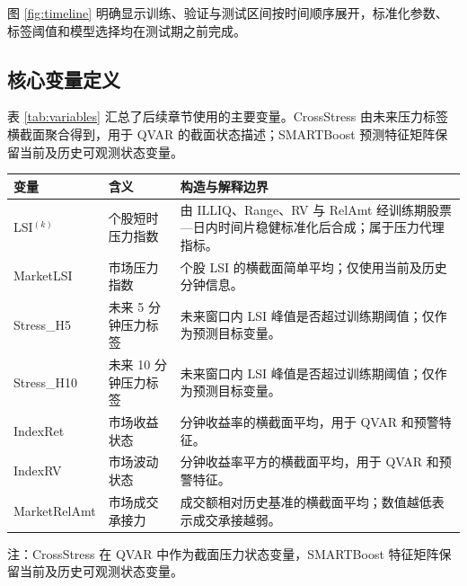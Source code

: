 \documentclass[12pt,a4paper]{ctexart}
\begin{document}
图 \ref{fig:timeline} 明确显示训练、验证与测试区间按时间顺序展开，标准化参数、标签阈值和模型选择均在测试期之前完成。


\subsection{核心变量定义}

表 \ref{tab:variables} 汇总了后续章节使用的主要变量。CrossStress 由未来压力标签横截面聚合得到，用于 QVAR 的截面状态描述；SMARTBoost 预测特征矩阵保留当前及历史可观测状态变量。

\begin{center}
\begingroup
\captionsetup{type=table}
\begin{minipage}{\textwidth}
\centering
{}
\label{tab:variables}
\small
\begin{threeparttable}
\begin{tabularx}{\textwidth}{p{}p{}Y}
\toprule
变量 & 含义 & 构造与解释边界 \\
\midrule
LSI\(^{(k)}\) & 个股短时压力指数 & 由 ILLIQ、Range、RV 与 RelAmt 经训练期股票—日内时间片稳健标准化后合成；属于压力代理指标。 \\
MarketLSI & 市场压力指数 & 个股 LSI 的横截面简单平均；仅使用当前及历史分钟信息。 \\
Stress\_H5 & 未来 5 分钟压力标签 & 未来窗口内 LSI 峰值是否超过训练期阈值；仅作为预测目标变量。 \\
Stress\_H10 & 未来 10 分钟压力标签 & 未来窗口内 LSI 峰值是否超过训练期阈值；仅作为预测目标变量。 \\
IndexRet & 市场收益状态 & 分钟收益率的横截面平均，用于 QVAR 和预警特征。 \\
IndexRV & 市场波动状态 & 分钟收益率平方的横截面平均，用于 QVAR 和预警特征。 \\
MarketRelAmt & 市场成交承接力 & 成交额相对历史基准的横截面平均；数值越低表示成交承接越弱。 \\
\bottomrule
\end{tabularx}
\begin{tablenotes}[flushleft]
\footnotesize
\item 注：CrossStress 在 QVAR 中作为截面压力状态变量，SMARTBoost 特征矩阵保留当前及历史可观测状态变量。
\end{tablenotes}
\end{threeparttable}
\end{minipage}
\endgroup
\end{center}
\end{document}
